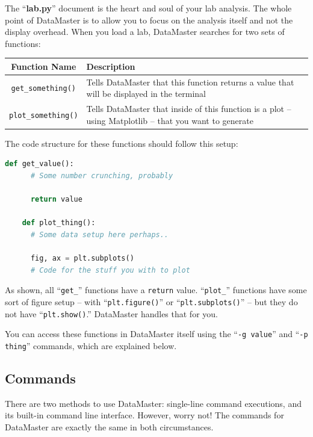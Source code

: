 \documentclass[12pt]{article}
\begin{document}
{%
The ``\textbf{lab.py}'' document is the heart and soul of your lab analysis. The whole point of DataMaster is to allow you to focus on the analysis itself and not the display overhead. When you load a lab, DataMaster searches for two sets of functions:
\begin{framed}
  \centering
  {
  \setlength{\tabcolsep}{14pt}
  \renewcommand{\arraystretch}{2.5}
    \begin{tabular}{ c | m{}}
      Function Name & Description\\\hline
      \texttt{get\_something()} & Tells DataMaster that this function returns a value that will be displayed in the terminal \\
      \texttt{plot\_something()} & Tells DataMaster that inside of this function is a plot -- using Matplotlib -- that you want to generate
    \end{tabular}
  }
\end{framed}
The code structure for these functions should follow this setup:
\begin{framed}
  \begin{lstlisting}[language=Python]
    def get_value():
      # Some number crunching, probably
      
      return value
    
    def plot_thing():
      # Some data setup here perhaps..
      
      fig, ax = plt.subplots()
      # Code for the stuff you with to plot
  \end{lstlisting}
\end{framed}
As shown, all ``\texttt{get\_}'' functions have a \texttt{return} value. ``\texttt{plot\_}'' functions have some sort of figure setup -- with ``\texttt{plt.figure()}'' or ``\texttt{plt.subplots()}'' -- but they do not have ``\texttt{plt.show()}.'' DataMaster handles that for you.

You can access these functions in DataMaster itself using the ``\texttt{-g value}'' and ``\texttt{-p thing}'' commands, which are explained below.

\subsection*{Commands}
\label{subsec:commands}

There are two methods to use DataMaster: single-line command executions, and its built-in command line interface. However, worry not! The commands for DataMaster are exactly the same in both circumstances.

}
\end{document}
